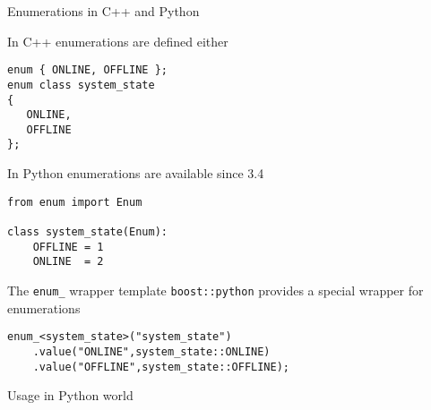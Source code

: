 
\begin{frame}[fragile]{Enumerations in C++ and Python}

    In C++ enumerations are defined either
    \begin{verbatim}
enum { ONLINE, OFFLINE };
enum class system_state
{ 
   ONLINE, 
   OFFLINE 
};
    \end{verbatim}

    \vspace{0.1\textheight}
    In Python enumerations are available since 3.4
    \begin{verbatim}
from enum import Enum

class system_state(Enum):
    OFFLINE = 1
    ONLINE  = 2
    \end{verbatim}
\end{frame}

\begin{frame}[fragile]{The \texttt{enum\_} wrapper template}
    \texttt{boost::python} provides a special wrapper for enumerations
    \begin{verbatim}
enum_<system_state>("system_state")
    .value("ONLINE",system_state::ONLINE)
    .value("OFFLINE",system_state::OFFLINE);
    \end{verbatim}
\end{frame}

\begin{frame}[fragile]{Usage in Python}
world
\end{frame}
